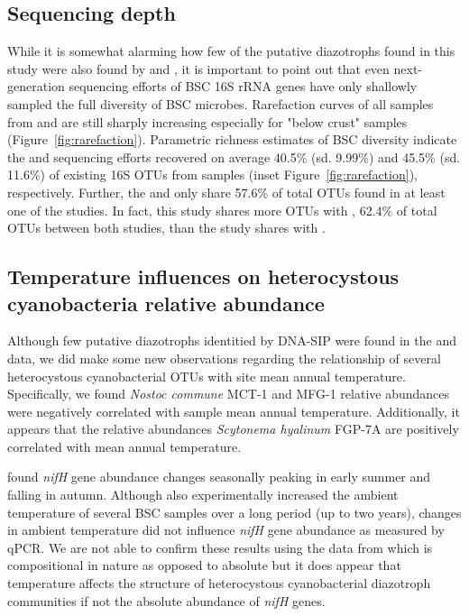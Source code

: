 \subsection{Sequencing depth}
While it is somewhat alarming how few of the putative diazotrophs found in this study were also found by \citet{Garcia_Pichel_2013} and \citet{Steven_2013}, it is important to point out that even next-generation sequencing efforts of BSC 16S rRNA genes have only shallowly sampled the full diversity of BSC microbes. Rarefaction curves of all samples from \citet{Steven_2013} and \citet{Garcia_Pichel_2013} are still sharply increasing especially for "below crust" samples (Figure~\ref{fig:rarefaction}). Parametric richness estimates of BSC diversity indicate the \citet{Steven_2013} and \citet{Garcia_Pichel_2013} sequencing efforts recovered on average 40.5\% (sd. 9.99\%) and 45.5\% (sd. 11.6\%) of existing 16S OTUs from samples (inset Figure~\ref{fig:rarefaction}), respectively. Further, the \citet{Steven_2013} and \citet{Garcia_Pichel_2013} only share 57.6\% of total OTUs found in at least one of the studies. In fact, this study shares more OTUs with \citet{Steven_2013}, 62.4\% of total OTUs between both studies, than the \citet{Steven_2013} study shares with \citet{Garcia_Pichel_2013}. 

\subsection{Temperature influences on heterocystous cyanobacteria relative abundance}
Although few putative diazotrophs identitied by DNA-SIP were found in the \citet{Garcia_Pichel_2013} and \citet{Steven_2013} data, we did make some new observations regarding the relationship of several heterocystous cyanobacterial OTUs with site mean annual temperature. Specifically, we found \textit{Nostoc commune} MCT-1 and MFG-1 relative abundances were negatively correlated with sample mean annual temperature. Additionally, it appears that the relative abundances \textit{Scytonema hyalinum} FGP-7A  are positively correlated with mean annual temperature.

\citet{Yeager_2012} found \textit{nifH} gene abundance changes seasonally peaking in early summer and falling in autumn. Although \citet{Yeager_2012} also experimentally increased the ambient temperature of several BSC samples over a long period (up to two years), changes in ambient temperature did not influence \textit{nifH} gene abundance as measured by qPCR. We are not able to confirm these results using the data from \citet{Garcia_Pichel_2013} which is compositional in nature as opposed to absolute but it does appear that temperature affects the structure of heterocystous cyanobacterial diazotroph communities if not the absolute abundance of \textit{nifH} genes. 

